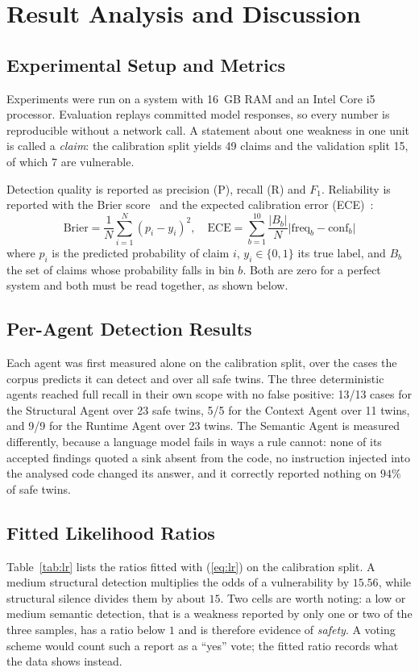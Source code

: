\documentclass[conference]{IEEEtran}
\begin{document}
\section{Result Analysis and Discussion} \label{RES}

\subsection{Experimental Setup and Metrics}
Experiments were run on a system with 16~GB RAM and an Intel Core i5
processor. Evaluation replays committed model responses, so every number is
reproducible without a network call. A statement about one weakness in one
unit is called a \emph{claim}: the calibration split yields 49 claims and
the validation split 15, of which 7 are vulnerable.

Detection quality is reported as precision (P), recall (R) and $F_1$.
Reliability is reported with the Brier score~\cite{brier1950} and the
expected calibration error (ECE)~\cite{guo2017calibration}:
\begin{equation}
\mathrm{Brier}=\frac{1}{N}\sum_{i=1}^{N}\left(p_i-y_i\right)^2,\quad
\mathrm{ECE}=\sum_{b=1}^{10}\frac{|B_b|}{N}\bigl|\mathrm{freq}_b-\mathrm{conf}_b\bigr|
\label{eq:metrics}
\end{equation}
where $p_i$ is the predicted probability of claim $i$, $y_i\in\{0,1\}$ its
true label, and $B_b$ the set of claims whose probability falls in bin $b$.
Both are zero for a perfect system and both must be read together, as
shown below.

\subsection{Per-Agent Detection Results}
Each agent was first measured alone on the calibration split, over the
cases the corpus predicts it can detect and over all safe twins. The three
deterministic agents reached full recall in their own scope with no false
positive: 13/13 cases for the Structural Agent over 23 safe twins, 5/5 for
the Context Agent over 11 twins, and 9/9 for the Runtime Agent over 23
twins. The Semantic Agent is measured differently, because a language model
fails in ways a rule cannot: none of its accepted findings quoted a sink
absent from the code, no instruction injected into the analysed code
changed its answer, and it correctly reported nothing on $94\%$ of safe
twins.

\subsection{Fitted Likelihood Ratios}
Table~\ref{tab:lr} lists the ratios fitted with (\ref{eq:lr}) on the
calibration split. A medium structural detection multiplies the odds of a
vulnerability by $15.56$, while structural silence divides them by about
$15$. Two cells are worth noting: a low or medium semantic detection, that
is a weakness reported by only one or two of the three samples, has a ratio
below $1$ and is therefore evidence of \emph{safety}. A voting scheme would
count such a report as a ``yes'' vote; the fitted ratio records what the
data shows instead.
\end{document}
